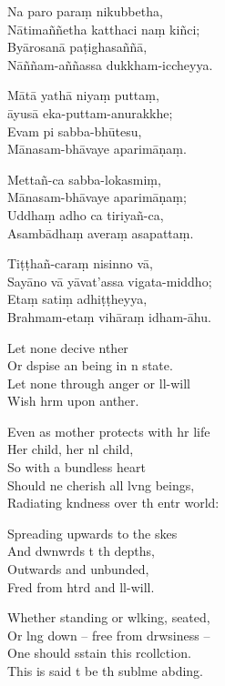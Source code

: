 \clearpage

Na paro paraṃ nikubbetha,\\                                                                          %
Nātimaññetha katthaci naṃ kiñci;\\
Byārosanā paṭighasaññā,\\
Nāññam-aññassa dukkham-iccheyya.

Mātā yathā niyaṃ puttaṃ,\\
āyusā eka-puttam-anurakkhe;\\
Evam pi sabba-bhūtesu,\\
Mānasam-bhāvaye aparimāṇaṃ.

Mettañ-ca sabba-lokasmiṃ,\\
Mānasam-bhāvaye aparimāṇaṃ;\\
Uddhaṃ adho ca tiriyañ-ca,\\
Asambādhaṃ averaṃ asapattaṃ.

Tiṭṭhañ-caraṃ nisinno vā,\\
Sayāno vā yāvat'assa vigata-middho;\\
Etaṃ satiṃ adhiṭṭheyya,\\
Brahmam-etaṃ vihāraṃ idham-āhu.


\clearpage

Let none decive nther\\                                                             %
Or dspise an being in n state.\\
Let none through anger or ll-will\\
Wish hrm upon anther.

Even as  mother protects with hr life\\
Her child, her nl child,\\
So with a bundless heart\\
Should ne cherish all lvng beings,\\
Radiating kndness over th entr world:

Spreading upwards to the skes\\
And dwnwrds t th depths,\\
Outwards and unbunded,\\
Fred from htrd and ll-will.

Whether standing or wlking, seated, \\
Or lng down -- free from drwsiness --\\
One should sstain this rcollction.\\
This is said t be th sublme abding.

